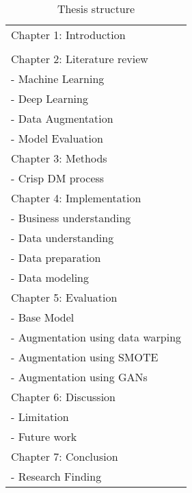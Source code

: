 \begin{table}[ht]
	\centering
	\caption{Thesis structure}
	\label{table:Structure}
	\begin{tabular}{p{7cm} }
		\\
		\cellcolor{gray!25} Chapter 1: Introduction\\
		\\
		\cellcolor{gray!25} Chapter 2: Literature review\\
		- Machine Learning\\
		- Deep Learning\\
		- Data Augmentation \\
		- Model Evaluation \\
		
		\cellcolor{gray!25} Chapter 3: Methods\\
		- Crisp DM process\\
		
		\cellcolor{gray!25} Chapter 4: Implementation\\
		- Business understanding\\
		- Data understanding\\				
		- Data preparation\\
		- Data modeling\\
		
		\cellcolor{gray!25} Chapter 5: Evaluation\\
		- Base Model\\
		- Augmentation using data warping\\
		- Augmentation using SMOTE\\
		- Augmentation using GANs\\				
		
		\cellcolor{gray!25}	Chapter 6: Discussion\\
		- Limitation\\	
		- Future work\\
		
		\cellcolor{gray!25}	Chapter 7: Conclusion\\
		- Research Finding
	\end{tabular}
\end{table}



